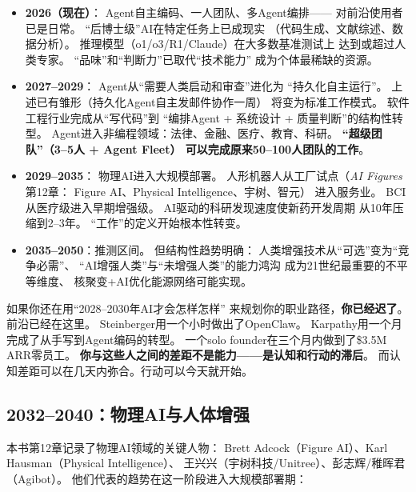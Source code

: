 \begin{itemize}
  \item \textbf{2026（现在）}：
    Agent自主编码、一人团队、多Agent编排——
    对前沿使用者已是日常。
    ``后博士级''AI在特定任务上已成现实
    （代码生成、文献综述、数据分析）。
    推理模型（o1/o3/R1/Claude）在大多数基准测试上
    达到或超过人类专家。
    ``品味''和``判断力''已取代``技术能力''
    成为个体最稀缺的资源。

  \item \textbf{2027--2029}：
    Agent从``需要人类启动和审查''进化为
    ``持久化自主运行''。
    上述已有雏形（持久化Agent自主发邮件协作一周）
    将变为标准工作模式。
    软件工程行业完成从``写代码''到
    ``编排Agent + 系统设计 + 质量判断''的结构性转型。
    Agent进入非编程领域：法律、金融、医疗、教育、科研。
    \textbf{``超级团队''（3--5人 + Agent Fleet）
    可以完成原来50--100人团队的工作}。

  \item \textbf{2029--2035}：
    物理AI进入大规模部署。
    人形机器人从工厂试点（\textit{AI Figures}第12章：
    Figure AI、Physical Intelligence、宇树、智元）
    进入服务业。
    BCI从医疗级进入早期增强级。
    AI驱动的科研发现速度使新药开发周期
    从10年压缩到2--3年。
    ``工作''的定义开始根本性转变。

  \item \textbf{2035--2050}：推测区间。
    但结构性趋势明确：
    人类增强技术从``可选''变为``竞争必需''、
    ``AI增强人类''与``未增强人类''的能力鸿沟
    成为21世纪最重要的不平等维度、
    核聚变+AI优化能源网络可能实现。
\end{itemize}

\begin{corebox}[对你的直接含义]
如果你还在用``2028--2030年AI才会怎样怎样''
来规划你的职业路径，\textbf{你已经迟了}。
前沿已经在这里。
Steinberger用一个小时做出了OpenClaw。
Karpathy用一个月完成了从手写到Agent编码的转型。
一个solo founder在三个月内做到了\$3.5M ARR零员工。
\textbf{你与这些人之间的差距不是能力——是认知和行动的滞后}。
而认知差距可以在几天内弥合。行动可以今天就开始。
\end{corebox}

\subsection{2032--2040：物理AI与人体增强}

本书第12章记录了物理AI领域的关键人物：
Brett Adcock（Figure AI）、Karl Hausman（Physical Intelligence）、
王兴兴（宇树科技/Unitree）、彭志辉/稚晖君（Agibot）。
他们代表的趋势在这一阶段进入大规模部署期：

